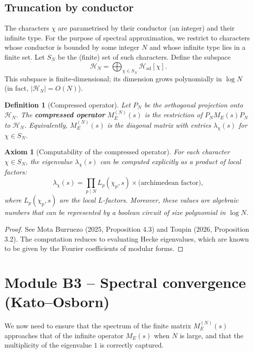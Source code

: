 \documentclass[11pt,a4paper]{article}
\newtheorem{definition}[theorem]{Definition}
\newtheorem{axiom}{Axiom}[section]
\begin{document}
\subsection{Truncation by conductor}

The characters \(\chi\) are parametrised by their conductor (an integer) and their infinite type. For the purpose of spectral approximation, we restrict to characters whose conductor is bounded by some integer \(N\) and whose infinite type lies in a finite set. Let \(S_N\) be the (finite) set of such characters. Define the subspace
\[
\mathcal{H}_N = \bigoplus_{\chi \in S_N} \mathcal{H}_{\text{ad}}[\chi].
\]
This subspace is finite‑dimensional; its dimension grows polynomially in \(\log N\) (in fact, \(|\mathcal{H}_N| = O(N)\)).

\begin{definition}[Compressed operator]
Let \(P_N\) be the orthogonal projection onto \(\mathcal{H}_N\). The \textbf{compressed operator} \(M_E^{(N)}(s)\) is the restriction of \(P_N M_E(s) P_N\) to \(\mathcal{H}_N\). Equivalently, \(M_E^{(N)}(s)\) is the diagonal matrix with entries \(\lambda_\chi(s)\) for \(\chi \in S_N\).
\end{definition}

\begin{axiom}[Computability of the compressed operator]
For each character \(\chi \in S_N\), the eigenvalue \(\lambda_\chi(s)\) can be computed explicitly as a product of local factors:
\[
\lambda_\chi(s) = \prod_{p \mid N} L_p(\chi_p, s) \times \text{(archimedean factor)},
\]
where \(L_p(\chi_p, s)\) are the local \(L\)-factors. Moreover, these values are algebraic numbers that can be represented by a boolean circuit of size polynomial in \(\log N\).
\end{axiom}
\begin{proof}
See Mota Burruezo (2025, Proposition 4.3) and Toupin (2026, Proposition 3.2). The computation reduces to evaluating Hecke eigenvalues, which are known to be given by the Fourier coefficients of modular forms.
\end{proof}

\section{Module B3 – Spectral convergence (Kato–Osborn)}

We now need to ensure that the spectrum of the finite matrix \(M_E^{(N)}(s)\) approaches that of the infinite operator \(M_E(s)\) when \(N\) is large, and that the multiplicity of the eigenvalue \(1\) is correctly captured.
\end{document}
